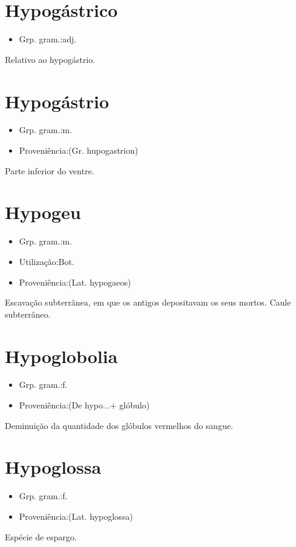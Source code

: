 \documentclass{article}
\begin{document}
\section{Hypogástrico}
\begin{itemize}
\item {Grp. gram.:adj.}
\end{itemize}
Relativo ao hypogástrio.
\section{Hypogástrio}
\begin{itemize}
\item {Grp. gram.:m.}
\end{itemize}
\begin{itemize}
\item {Proveniência:(Gr. \textunderscore hupogastrion\textunderscore )}
\end{itemize}
Parte inferior do ventre.
\section{Hypogeu}
\begin{itemize}
\item {Grp. gram.:m.}
\end{itemize}
\begin{itemize}
\item {Utilização:Bot.}
\end{itemize}
\begin{itemize}
\item {Proveniência:(Lat. \textunderscore hypogaeos\textunderscore )}
\end{itemize}
Escavação subterrânea, em que os antigos depositavam os seus mortos.
Caule subterrâneo.
\section{Hypoglobolia}
\begin{itemize}
\item {Grp. gram.:f.}
\end{itemize}
\begin{itemize}
\item {Proveniência:(De \textunderscore hypo...\textunderscore  + \textunderscore glóbulo\textunderscore )}
\end{itemize}
Deminuição da quantidade dos glóbulos vermelhos do sangue.
\section{Hypoglossa}
\begin{itemize}
\item {Grp. gram.:f.}
\end{itemize}
\begin{itemize}
\item {Proveniência:(Lat. \textunderscore hypoglossa\textunderscore )}
\end{itemize}
Espécie de espargo.
\end{document}
